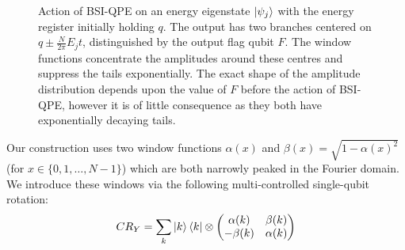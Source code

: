 \documentclass[aps,floatfix,10pt,amssymb,amsfont,amsmath,superscriptaddress,float,nofootinbib,longbibliography,nobalancelastpage,twocolumn]{revtex4-2}
\begin{document}
\begin{figure}
\begin{tikzpicture}
\end{tikzpicture}
\caption{Action of BSI-QPE on an energy eigenstate $\ket{\psi_j}$ with the energy register initially holding $q$. The output has two branches centered on $q\pm\frac{N}{2\pi}E_jt$, distinguished by the output flag qubit $F$. The window functions concentrate the amplitudes around these centres and suppress the tails exponentially. The exact shape of the amplitude distribution depends upon the value of $F$ before the action of BSI-QPE, however it is of little consequence as they both have exponentially decaying tails.}
\label{fig:Gshift}
\end{figure}

Our construction uses two window functions $\alpha(x)$ and $\beta(x) = \sqrt{1-\alpha(x)^2}$ (for $x\in\{0,1,\ldots,N-1\}$) which are both narrowly peaked in the Fourier domain. We introduce these windows via the following multi-controlled single-qubit rotation:
\begin{equation}
   CR_Y = \sum_k \ket{k}\bra{k}\otimes \begin{pmatrix}
        \alpha(k)& \beta(k)\\
        -\beta(k)& \alpha(k)
    \end{pmatrix}
\end{equation}
\end{document}
